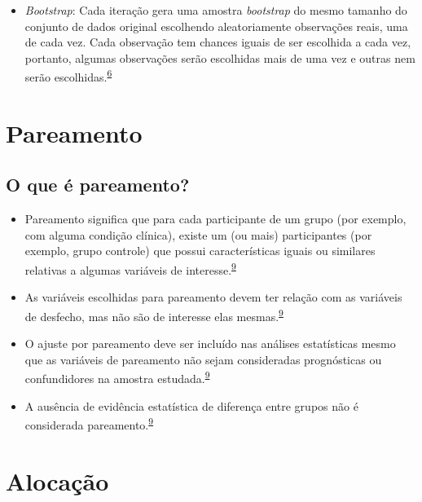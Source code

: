 \documentclass[
  a4paper,
]{book}
\providecommand{\tightlist}{%
  \setlength{\itemsep}{0pt}\setlength{\parskip}{0pt}}
\begin{document}
\begin{itemize}
\tightlist
\item
  \emph{Bootstrap}: Cada iteração gera uma amostra \emph{bootstrap} do mesmo tamanho do conjunto de dados original escolhendo aleatoriamente observações reais, uma de cada vez. Cada observação tem chances iguais de ser escolhida a cada vez, portanto, algumas observações serão escolhidas mais de uma vez e outras nem serão escolhidas.\textsuperscript{\protect\hyperlink{ref-Bland2015}{6}}
\end{itemize}

\hypertarget{pareamento}{%
\section{Pareamento}\label{pareamento}}

\hypertarget{o-que-uxe9-pareamento}{%
\subsection{O que é pareamento?}\label{o-que-uxe9-pareamento}}

\begin{itemize}
\item
  Pareamento significa que para cada participante de um grupo (por exemplo, com alguma condição clínica), existe um (ou mais) participantes (por exemplo, grupo controle) que possui características iguais ou similares relativas a algumas variáveis de interesse.\textsuperscript{\protect\hyperlink{ref-Bland1994}{9}}
\item
  As variáveis escolhidas para pareamento devem ter relação com as variáveis de desfecho, mas não são de interesse elas mesmas.\textsuperscript{\protect\hyperlink{ref-Bland1994}{9}}
\item
  O ajuste por pareamento deve ser incluído nas análises estatísticas mesmo que as variáveis de pareamento não sejam consideradas prognósticas ou confundidores na amostra estudada.\textsuperscript{\protect\hyperlink{ref-Bland1994}{9}}
\item
  A ausência de evidência estatística de diferença entre grupos não é considerada pareamento.\textsuperscript{\protect\hyperlink{ref-Bland1994}{9}}
\end{itemize}

\hypertarget{alocacao}{%
\section{Alocação}\label{alocacao}}
\end{document}
